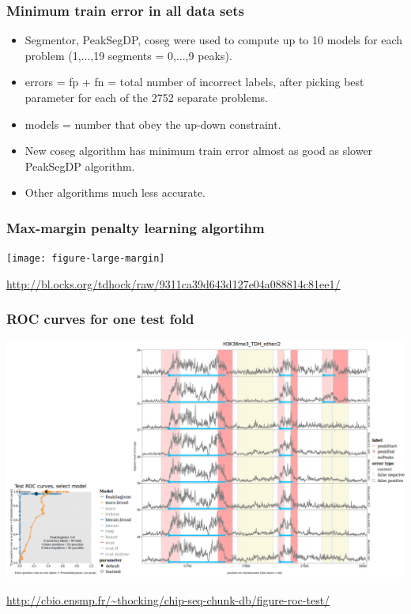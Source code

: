 \documentclass{beamer}
\begin{document}



\begin{frame}
  \frametitle{Minimum train error in all data sets}
  \begin{center}
      
  \end{center}
  \begin{itemize}
  \item Segmentor, PeakSegDP, coseg were used to compute up to 10
    models for each problem (1,...,19 segments = 0,...,9 peaks).
  \item errors = fp + fn = total number of incorrect labels, after
    picking best parameter for each of the 2752 separate problems.
  \item models = number that obey the up-down constraint.
  \item New coseg algorithm has minimum train error almost as good as
    slower PeakSegDP algorithm.
  \item Other algorithms much less accurate.
  \end{itemize}
\end{frame}

\begin{frame}
  \frametitle{Max-margin penalty learning algortihm}
  \texttt{[image: figure-large-margin]}

\scriptsize \url{http://bl.ocks.org/tdhock/raw/9311ca39d643d127e04a088814c81ee1/}

\end{frame}

\begin{frame}
  \frametitle{ROC curves for one test fold}
  \includegraphics[width=\textwidth]{screenshot-roc-test-interactive}
  
  \scriptsize \url{http://cbio.ensmp.fr/~thocking/chip-seq-chunk-db/figure-roc-test/}
\end{frame}
\end{document}
